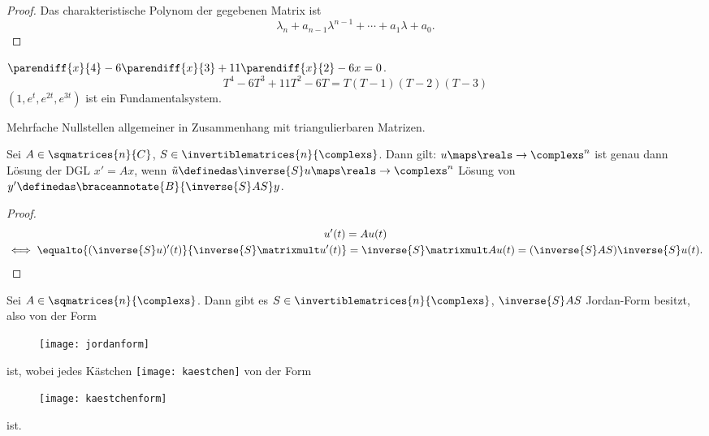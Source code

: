 \begin{proof}
  Das charakteristische Polynom der gegebenen Matrix ist
  \begin{equation*}
    \lambda_n + a_{n-1}\lambda^{n-1}+\dotsb+a_1 \lambda+a_0.
  \end{equation*}
\end{proof}
\begin{beispiel*}
  \( \parendiff{x}{4}-6\parendiff{x}{3}+11\parendiff{x}{2}-6x=0 \).
  \begin{equation*}
    T^4-6T^3+11T^2-6T=T(T-1)(T-2)(T-3)
  \end{equation*}
  \timplies \( (1,e^t,e^{2t},e^{3t}) \) ist ein Fundamentalsystem.

  Mehrfache Nullstellen \tto allgemeiner in Zusammenhang mit triangulierbaren Matrizen.
\end{beispiel*}
\begin{lemma}
  Sei \( A\in \sqmatrices{n}{C} \), \( S\in \invertiblematrices{n}{\complexs} \). Dann gilt: \( u\maps \reals\to \complexs^n \) ist genau dann Lösung der DGL \( x'=Ax \), wenn \( \tilde{u}\definedas \inverse{S}u \maps \reals\to \complexs^n \) Lösung von \( y'\definedas \braceannotate{B}{\inverse{S}AS}y \).
\end{lemma}
\begin{proof}
  \begin{gather*}
    u'(t)=A u(t)\\
    \iff \equalto{(\inverse{S}u)'(t)}{\inverse{S}\matrixmult u'(t)}=\inverse{S}\matrixmult A u(t)=(\inverse{S}A S)\inverse{S}u(t).
  \end{gather*}  
\end{proof}
\begin{bemerkung*}
  Sei \( A\in \sqmatrices{n}{\complexs} \). Dann gibt es \( S\in \invertiblematrices{n}{\complexs} \), \sd \( \inverse{S}AS \) Jordan-Form besitzt, also von der Form
  \begin{figure}[H]
    \centering
    \texttt{[image: jordanform]}
    \label{fig:jordanform}
  \end{figure}
  ist, wobei jedes Kästchen \texttt{[image: kaestchen]} von der Form
  \begin{figure}[H]
    \centering
    \texttt{[image: kaestchenform]}
    \label{fig:kaestchenform}
  \end{figure}
  ist.
\end{bemerkung*}
